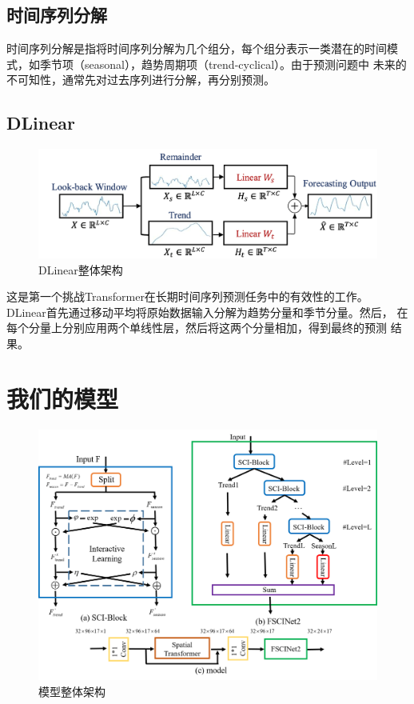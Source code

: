 \documentclass[twoside,a4paper]{article}
\begin{document}
\begin{CJK*}{UTF8}{gkai}
\subsection{时间序列分解}
时间序列分解是指将时间序列分解为几个组分，每个组分表示一类潜在的时间模
式，如季节项（seasonal），趋势周期项（trend-cyclical）。由于预测问题中
未来的不可知性，通常先对过去序列进行分解，再分别预测。

\subsection{DLinear}
  \begin{figure}[ht]
\centering
\includegraphics[scale=0.45]{pics/DLInear.png}
\caption{DLinear整体架构}
\end{figure}

这是第一个挑战Transformer在长期时间序列预测任务中的有效性的工作。
DLinear首先通过移动平均将原始数据输入分解为趋势分量和季节分量。然后，
在每个分量上分别应用两个单线性层，然后将这两个分量相加，得到最终的预测
结果。

\section{我们的模型}
  \begin{figure}[ht]
\centering
\includegraphics[scale=0.45]{pics/FSCINet2.png}
\caption{模型整体架构}
\label{fig:FSCINet2}
\end{figure}


\end{CJK*}
\end{document}
